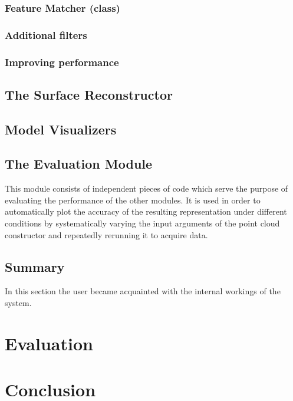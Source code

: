 \documentclass[12pt,a4paper,twoside,openright]{report}
\begin{document}
\subsection{Feature Matcher (class)}
\subsection{Additional filters}
\subsection{Improving performance}

\section{The Surface Reconstructor}

\section{Model Visualizers}

\section{The Evaluation Module}
This module consists of independent pieces of code which serve the purpose of evaluating the performance of the other modules. It is used in order to automatically plot the accuracy of the resulting representation under different conditions by systematically varying the input arguments of the point cloud constructor and repeatedly rerunning  it to acquire data. 

\section{Summary} 
In this section the user became  acquainted with the internal workings of the system.  


\chapter{Evaluation}


\chapter{Conclusion}




\appendix
\end{document}
